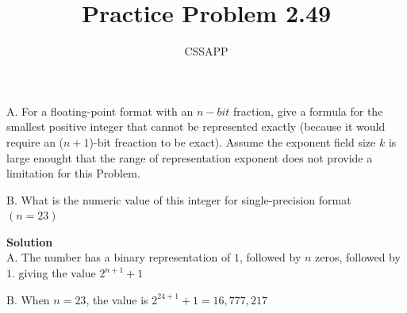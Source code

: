 \documentclass{article}
\title{Practice Problem 2.49}
\author{CSSAPP}
\begin{document}
    \maketitle
    \begin{flushleft}
      A. For a floating-point format with an $n-bit$ fraction, give a formula for the 
      smallest positive integer that cannot be represented exactly (because it would require an ($n + 1$)-bit freaction to be exact).
      Assume the exponent field size $k$ is large enought that the range of representation exponent
      does not provide a limitation for this Problem.

      B. What is the numeric value of this integer for single-precision format $(n = 23)$
    
    \bigskip 
    \textbf{Solution}\\
    A. The number has a binary representation of $1$, followed by $n$ zeros, followed by $1$.
      giving the value $2^{n+1} + 1$\\

    \bigskip

    B. When $n = 23$, the value is $2^{24+1} + 1 = 16,777,217$
    
    \end{flushleft}
\end{document}
